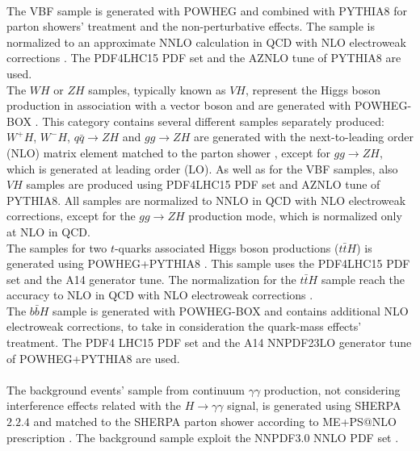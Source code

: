 \\
The VBF sample is generated with P{\scriptsize OWHEG} \cite{Nason_2010} and combined with P{\scriptsize YTHIA}8 for parton showers' treatment and the non-perturbative effects. The sample is normalized to an approximate NNLO calculation in QCD with NLO electroweak corrections \cite{Ciccolini_2008, PhysRevLett_105_011801}. The PDF4LHC15 PDF set and the AZNLO tune of P{\scriptsize YTHIA}8 are used.
\\
The $WH$ or $ZH$ samples, typically known as $VH$, represent the Higgs boson production in association with a vector boson and are generated with P{\scriptsize OWHEG}-B{\scriptsize OX} \cite{Luisoni_2013}. This category contains several different samples separately produced: $W^+H$, $W^-H$, $q\bar{q} \rightarrow ZH$ and $gg \rightarrow ZH$ are generated with the next-to-leading order (NLO) matrix element matched to the parton shower , except for $gg \rightarrow ZH$, which is generated at leading order (LO). As well as for the VBF samples, also $VH$ samples are produced using PDF4LHC15 PDF set and AZNLO tune of P{\scriptsize YTHIA}8. All samples are normalized to NNLO in QCD with NLO electroweak corrections, except for the $gg \rightarrow ZH$ production mode, which is normalized only at NLO in QCD.
\\
The samples for two $t$-quarks associated Higgs boson productions ($t\bar{t}H$) is generated using P{\scriptsize OWHEG+}P{\scriptsize YTHIA}8 \cite{Hartanto2015HiggsBP}. This sample uses the PDF4LHC15 PDF set and the A14 generator tune. The normalization for the $t\bar{t}H$ sample reach the accuracy to NLO in QCD with NLO electroweak corrections \cite{Dawson_2003, Zhang_2014}.
\\
The $b\bar{b}H$ sample is generated with P{\scriptsize OWHEG}-B{\scriptsize OX} \cite{Jager2016HiggsBP} and contains additional NLO electroweak corrections, to take in consideration the quark-mass effects' treatment. The PDF4 LHC15 PDF set and the A14 NNPDF23LO generator tune of P{\scriptsize OWHEG+}P{\scriptsize YTHIA}8 are used.
\\\\
The background events' sample from continuum $\gamma\gamma$ production, not considering interference effects related with the $H \rightarrow \gamma\gamma$ signal, is generated using  S{\scriptsize HERPA} $2.2.4$ \cite{Bothmann_2019} and matched to the S{\scriptsize HERPA} parton shower according to ME+PS@NLO prescription \cite{H_che_2013, Catani2001QCDME}. The background sample exploit the NNPDF3.0 NNLO PDF set \cite{Ball_2015}.
